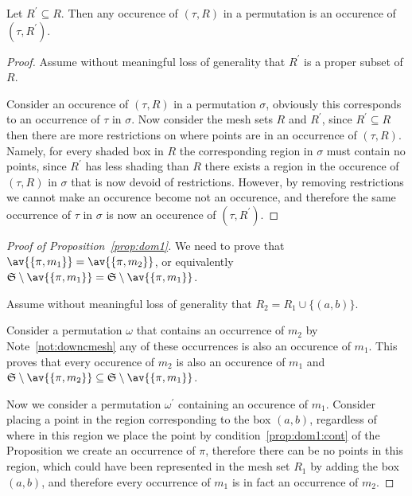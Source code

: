 \begin{note}
    \label{not:downcmesh}
    Let \(R^\prime \subseteq R\). Then any occurence of \((\tau, R)\) in a permutation
    is an occurence of \((\tau,R^\prime)\).
\end{note}
\begin{proof}
    Assume without meaningful loss of generality that \(R^\prime\) is a proper
    subset of \(R\).

    Consider an occurence of \((\tau, R)\) in a permutation \(\sigma\), obviously
    this corresponds to an occurrence of \(\tau\) in \(\sigma\). Now consider
    the mesh sets \(R\) and \(R^\prime\), since \(R^\prime \subseteq R\) then
    there are more restrictions on where points are in an occurrence of \((\tau,R)\).
    Namely, for every shaded box in \(R\) the corresponding region in \(\sigma\)
    must contain no points, since \(R^\prime\) has less shading than \(R\) there
    exists a region in the occurence of \((\tau,R)\) in \(\sigma\) that is
    now devoid of restrictions. However, by removing restrictions we cannot
    make an occurence become not an occurence, and therefore the same occurrence
    of \(\tau \) in \(\sigma\) is now an occurence of \((\tau, R^\prime)\).

\end{proof}
\begin{proof}[Proof of Proposition~\ref{prop:dom1}]

    We need to prove that \(\av{\{\pi,m_1\}} = \av{\{\pi,m_2\}}\), or equivalently
    \(\mathfrak{S}\setminus \av{\{\pi,m_1\}} = \mathfrak{S}\setminus \av{\{\pi,m_1\}}\).

    Assume without meaningful loss of generality that \(R_2 = R_1 \cup \{(a,b)\}\).

    Consider a permutation \(\omega\) that contains an occurrence of \(m_2\)
    by Note~\ref{not:downcmesh} any of these occurrences is also an occurence
    of \(m_1\). This proves that every occurence of \(m_2\) is also an
    occurence of \(m_1\) and \(\mathfrak{S}\setminus \av{\{\pi,m_2\}}
    \subseteq \mathfrak{S}\setminus \av{\{\pi,m_1\}}\).

    Now we consider a permutation \(\omega^\prime\) containing an occurence of
    \(m_1\). Consider placing a point in the region corresponding to the box
    \((a,b)\), regardless of where in this region we place the point by
    condition~\ref{prop:dom1:cont} of the Proposition we create an occurrence
    of \(\pi\), therefore there can be no points in this region, which
    could have been represented in the mesh set \(R_1\) by adding the box
    \((a,b)\), and therefore every occurrence of \(m_1\) is in fact an
    occurrence of \(m_2\).\qedhere


\end{proof}

